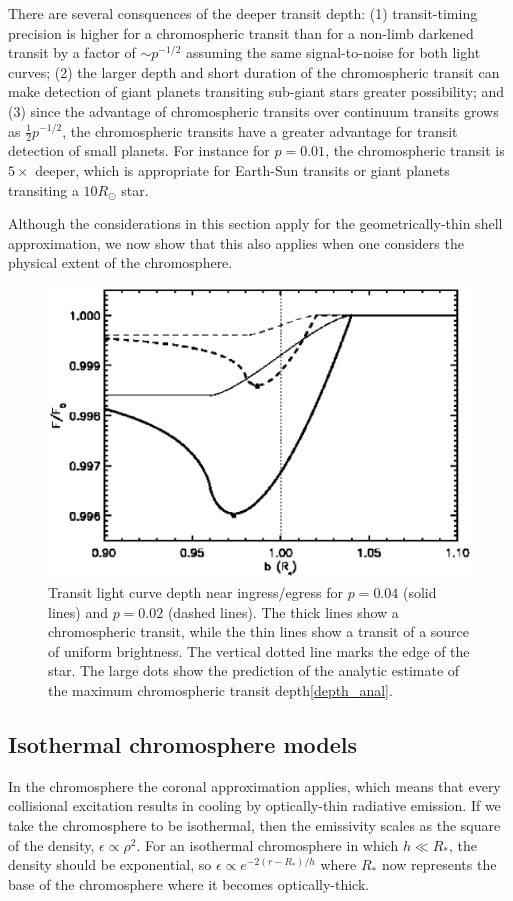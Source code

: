 \documentclass[manuscript]{aastex}
\begin{document}
There are several consquences of the deeper transit depth:
(1) transit-timing precision is higher for a chromospheric
transit than for a non-limb darkened transit by a factor of
$\sim p^{-1/2}$ assuming the same signal-to-noise for
both light curves; (2) the larger depth and short duration
of the chromospheric transit can make detection of giant
planets transiting sub-giant stars greater possibility;
and (3) since the advantage of chromospheric transits
over continuum transits grows as $\frac{1}{2}p^{-1/2}$,
the chromospheric transits have a greater advantage for
transit detection of small planets. For instance
for $p=0.01$, the chromospheric transit is $5\times$
deeper, which is appropriate for Earth-Sun transits
or giant planets transiting a $10R_\odot$ star.

Although the considerations in this section apply
for the geometrically-thin shell approximation,
we now show that this also applies when one considers
the physical extent of the chromosphere.

\begin{figure}
\includegraphics[width=0.5 \textwidth]{comp_size.eps}
\caption{Transit light curve depth near ingress/egress 
for $p=0.04$ (solid lines) and $p=0.02$ (dashed lines).
The thick lines show a chromospheric transit, while the 
thin lines show a transit of a source of uniform brightness.
The vertical dotted line marks the edge of the star.
The large dots show the prediction of the analytic
estimate of the maximum chromospheric transit depth\ref{depth_anal}.}
\label{fig02}
\end{figure}

\subsection{Isothermal chromosphere models}

In the chromosphere the coronal approximation applies,
which means that every collisional excitation results
in cooling by optically-thin radiative emission.
If we take the chromosphere to be isothermal, then
the emissivity scales as the square of the density,
$\epsilon \propto \rho^2$.  For an isothermal chromosphere
in which $h \ll R_*$, the density should be exponential,
so $\epsilon \propto e^{-2 (r-R_*)/h}$ where $R_*$
now represents the base of the chromosphere where it
becomes optically-thick.
\end{document}
